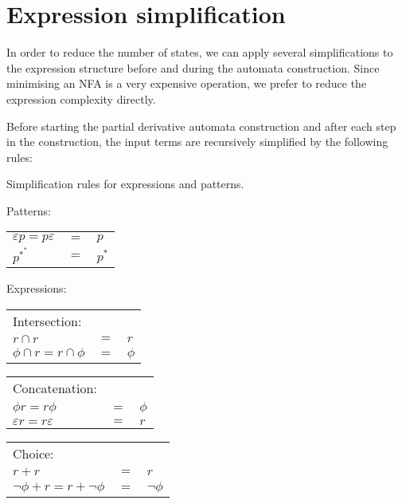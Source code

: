 \section{Expression simplification}

In order to reduce the number of states, we can apply several simplifications to
the expression structure before and during the automata construction. Since
minimising an NFA is a very expensive operation, we prefer to reduce the
expression complexity directly.

Before starting the partial derivative automata construction and after each step
in the construction, the input terms are recursively simplified by the following
rules:

\begin{defn}[Simplification]
   \label{defn-simplify}
   Simplification rules for expressions and patterns.

   Patterns:

   \begin{tabular}{lrl}
      $\varepsilon p = p \varepsilon$	& $=$	& $p$				\\
      $p^{*^*}$				& $=$	& $p^*$				\\
   \end{tabular}

   \needspace{3cm}
   Expressions:

   \begin{tabular}{lrl}
      Intersection:								\\
      $r \cap r$			& $=$	& $r$				\\
      $\phi \cap r = r \cap \phi$	& $=$	& $\phi$			\\
   \end{tabular}

   \begin{tabular}{lrl}
      Concatenation:								\\
      $\phi r = r \phi$			& $=$	& $\phi$			\\
      $\varepsilon r = r \varepsilon$	& $=$	& $r$				\\
   \end{tabular}

   \begin{tabular}{lrl}
      Choice:									\\
      $r + r$				& $=$	& $r$				\\
      $\neg\phi + r = r + \neg\phi$	& $=$	& $\neg\phi$			\\
   \end{tabular}


\end{defn}
